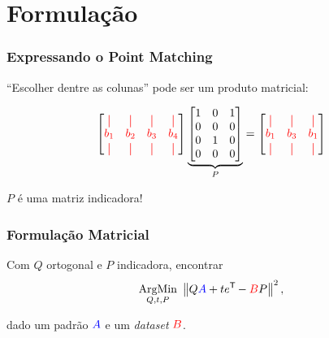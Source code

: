 \section{Formulação}

\begin{frame}[fragile]
  \frametitle{Expressando o Point Matching}
  \begin{center}
    ``Escolher dentre as colunas'' pode ser um produto matricial:

    \[
      \begin{bmatrix}
        \red{\vert} & \red{\vert} & \red{\vert} & \red{\vert} \\
        \red{b_1} & \red{b_2} & \red{b_3} & \red{b_4} \\
        \red{\vert} & \red{\vert} & \red{\vert} & \red{\vert}
      \end{bmatrix}
      \underbrace{\begin{bmatrix}
        1 & 0 & 1 \\
        0 & 0 & 0 \\
        0 & 1 & 0 \\
        0 & 0 & 0
      \end{bmatrix}}_{P}
      =
      \begin{bmatrix}
        \red{\vert} & \red{\vert} & \red{\vert} \\
        \red{b_1} & \red{b_3} & \red{b_1} \\
        \red{\vert} & \red{\vert} & \red{\vert}
      \end{bmatrix}
    \]

    $P$ é uma matriz indicadora!
  \end{center}
\end{frame}

\begin{frame}
  \frametitle{Formulação Matricial}
  \begin{center}
    Com $Q$ ortogonal e $P$ indicadora, encontrar
    \[\underset{Q,t,P}{\text{ArgMin}}\,\, \left\lVert Q\textcolor{blue}{A} + t e^{\mathsf{T}\mkern-1mu} - \textcolor{red}{B}P\right\rVert^2,\]

    dado um padrão $\textcolor{blue}{A}$ e um \textit{dataset} $\textcolor{red}{B}$.
  \end{center}
\end{frame}
